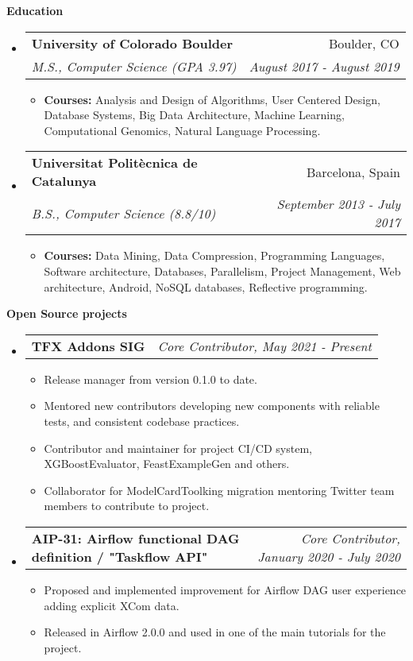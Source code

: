 \documentclass[letterpaper,10pt]{article}
\makeatletter
\newcommand{\resitem}[1]{\item #1 \vspace{-2pt}}
\newcommand{\resheading}[1]{{\large \colorbox{mygrey}{\begin{minipage}{\textwidth}{\textbf{#1 \vphantom{p\^{E}}}}\end{minipage}}}}
\newcommand{\ressubheading}[4]{
\begin{tabular*}{7.0in}{l@{\extracolsep{\fill}}r}
		\textbf{#1} & \textit{#4} \\
\end{tabular*}\vspace{-6pt}}
\newcommand{\ressubheadinged}[4]{
\begin{tabular*}{7.0in}{l@{\extracolsep{\fill}}r}
		\textbf{#1} & #2 \\
		\textit{#3} & \textit{#4}\\
\end{tabular*}\vspace{-6pt}}
\makeatother
\begin{document}
\break
\resheading{Education}
	\begin{itemize}
		\item
			\ressubheadinged{University of Colorado Boulder}{Boulder, CO}{M.S., Computer Science (GPA 3.97)}{August 2017 - August 2019}
			\begin{itemize}
				\resitem{\textbf{Courses:} Analysis and Design of Algorithms, User Centered Design, Database Systems, Big Data Architecture, Machine Learning, Computational Genomics, Natural Language Processing.}
			\end{itemize}

		\item
			\ressubheadinged{Universitat Polit\`ecnica de Catalunya}{Barcelona, Spain}{B.S., Computer Science (8.8/10)}{September 2013 - July 2017}
			\begin{itemize}
				\resitem{\textbf{Courses:} Data Mining, Data Compression, Programming Languages, Software architecture, Databases, Parallelism, Project Management, Web architecture, Android, NoSQL databases, Reflective programming.}
			\end{itemize}

	\end{itemize}

\resheading{Open Source projects}
	\begin{itemize}
\item 
		\ressubheading{TFX Addons SIG}{Boulder, CO}{Core Contributor}{Core Contributor, May 2021 - Present}
			\begin{itemize}
				\resitem{Release manager from version 0.1.0 to date.}
				\resitem{Mentored new contributors developing new components with reliable tests, and consistent codebase practices.}
				\resitem{Contributor and maintainer for project CI/CD system, XGBoostEvaluator, FeastExampleGen and others.}
				\resitem{Collaborator for ModelCardToolking migration mentoring Twitter team members to contribute to project.} 
			\end{itemize}
		\item
			\ressubheading{
AIP-31: Airflow functional DAG definition / "Taskflow API"}{Boulder, CO, USA}{ML Engineer}{Core Contributor, January 2020 - July 2020}
			\begin{itemize}
				\resitem{Proposed and implemented improvement for Airflow DAG user experience adding explicit XCom data.}
				\resitem{Released in Airflow 2.0.0 and used in one of the main tutorials for the project.}
				
			\end{itemize}
			
	\end{itemize}
\end{document}

